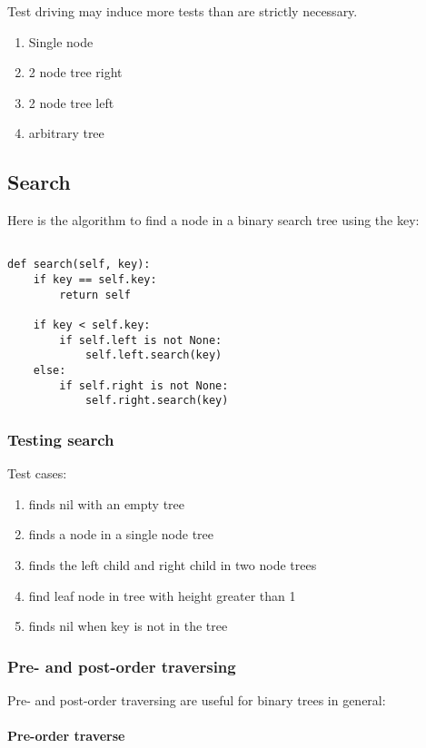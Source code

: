 \documentclass{article}
\begin{document}
Test driving may induce more tests than are strictly necessary.

\begin{enumerate}
\item Single node
\item 2 node tree right
\item 2 node tree left
\item arbitrary tree
\end{enumerate}

\subsection{Search}

Here is the algorithm to find a node in a binary search tree using the key:

\begin{lstlisting}[frame=single]

def search(self, key):
    if key == self.key:
        return self

    if key < self.key:
        if self.left is not None:
            self.left.search(key)
    else:
        if self.right is not None:
            self.right.search(key)
\end{lstlisting}

\subsubsection{Testing search}

Test cases:
\begin{enumerate}
\item finds nil with an empty tree
\item finds a node in a single node tree
\item finds the left child and right child in two node trees
\item find leaf node in tree with height greater than 1
\item finds nil when key is not in the tree
\end{enumerate}

\subsubsection{Pre- and post-order traversing}

Pre- and post-order traversing are useful for binary trees in general:

\paragraph{Pre-order traverse}
\end{document}
